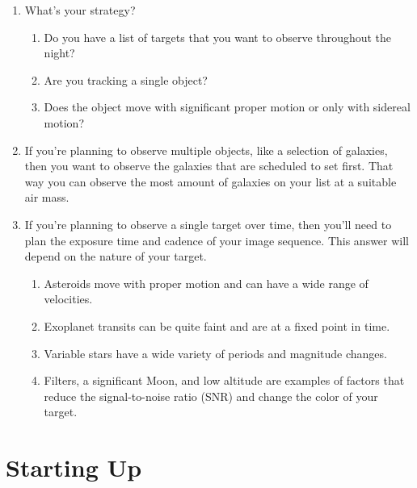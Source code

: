 \documentclass{article}
\begin{document}
	\begin{enumerate}
		
		\item What's your strategy?
		
		\begin{enumerate}
			
			\item Do you have a list of targets that you want to observe throughout the night?
			
			\item Are you tracking a single object?
			
			\item Does the object move with significant proper motion or only with sidereal motion?
			
		\end{enumerate}
		
		\item If you're planning to observe multiple objects, like a selection of galaxies, then you want to observe the galaxies that are scheduled to set first. That way you can observe the most amount of galaxies on your list at a suitable air mass.
		
		\item If you're planning to observe a single target over time, then you'll need to plan the exposure time and cadence of your image sequence. This answer will depend on the nature of your target.
		
		\begin{enumerate}
			
			\item Asteroids move with proper motion and can have a wide range of velocities.
			
			\item Exoplanet transits can be quite faint and are at a fixed point in time.
			
			\item Variable stars have a wide variety of periods and magnitude changes.
			
			\item Filters, a significant Moon, and low altitude are examples of factors that reduce the signal-to-noise ratio (SNR) and change the color of your target.
			
		\end{enumerate}
		
	\end{enumerate}
	
	\newpage
	\section{Starting Up}
	
\end{document}
